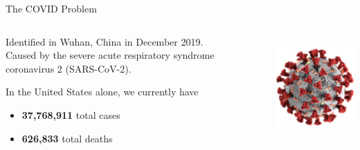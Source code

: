 \begin{slide}{The COVID Problem}
	\centering
	\begin{columns}[T]
		\begin{column}{.6\textwidth}
			Identified in Wuhan, China in December 2019. \\
	
			Caused by the severe acute respiratory syndrome coronavirus 2 (SARS-CoV-2). 
	
			\vspace{1cm}
	
			In the United States alone, we currently have
			\begin{itemize}
				\item \textbf{37,768,911} total cases
				\item \textbf{626,833} total deaths
			\end{itemize}
		\end{column}
		\begin{column}{.2\textwidth}
			\includegraphics[height=4cm]{images/covid-19}
		\end{column}
	\end{columns}
\end{slide}